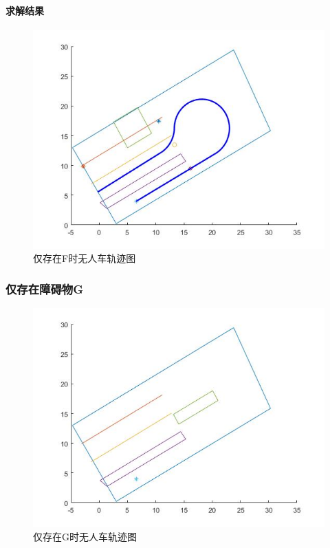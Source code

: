\documentclass{article}
\begin{document}
\paragraph{求解结果}
\begin{figure}[H]
    \centering
    \includegraphics[scale=0.5]{13.jpg}
    \caption{仅存在F时无人车轨迹图}
\end{figure}

\subsubsection{仅存在障碍物G}
\begin{figure}[h]
    \centering
    \includegraphics[scale=0.5]{14.jpg}
    \caption{仅存在G时无人车轨迹图}
\end{figure}
\end{document}
